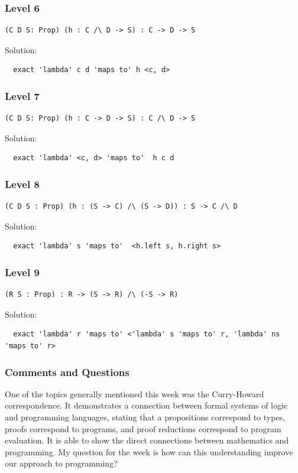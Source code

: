 \documentclass{article}
\theoremstyle{theorem}
\theoremstyle{definition}
\theoremstyle{remark}
\begin{document}
\subsubsection*{Level 6}
\begin{lstlisting}
(C D S: Prop) (h : C /\ D -> S) : C -> D -> S
\end{lstlisting}
Solution:
\begin{lstlisting}
  exact 'lambda' c d 'maps to' h <c, d>
\end{lstlisting}
\subsubsection*{Level 7}
\begin{lstlisting}
(C D S: Prop) (h : C -> D -> S) : C /\ D -> S
\end{lstlisting}
Solution:
\begin{lstlisting}
  exact 'lambda' <c, d> 'maps to'  h c d
\end{lstlisting}
\subsubsection*{Level 8}
\begin{lstlisting}
(C D S : Prop) (h : (S -> C) /\ (S -> D)) : S -> C /\ D
\end{lstlisting}
Solution:
\begin{lstlisting}
  exact 'lambda' s 'maps to'  <h.left s, h.right s> 
\end{lstlisting}
\subsubsection*{Level 9}
\begin{lstlisting}
(R S : Prop) : R -> (S -> R) /\ (-S -> R)
\end{lstlisting}
Solution:
\begin{lstlisting}
  exact 'lambda' r 'maps to' <'lambda' s 'maps to' r, 'lambda' ns 'maps to' r>
\end{lstlisting}


\subsubsection*{Comments and Questions}
One of the topics generally mentioned this week was the Curry-Howard correspondence.
It demonstrates a connection between formal systems of logic and programming languages,
stating that a propositions correspond to types, proofs correspond to programs, and proof reductions
correspond to program evaluation. It is able to show the direct connections between mathematics 
and programming. My question for the week is how can this understanding improve our approach to
programming?
\end{document}

